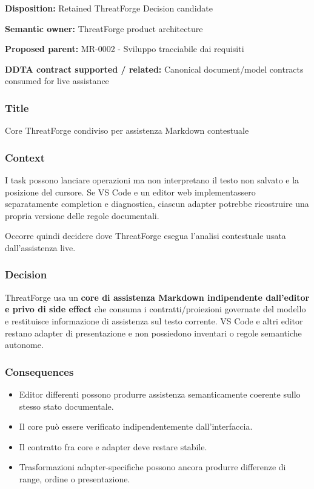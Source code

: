 \documentclass[
  10pt,
  a4paper,
]{article}
\providecommand{\tightlist}{%
  \setlength{\itemsep}{0pt}\setlength{\parskip}{0pt}}
\begin{document}
\textbf{Disposition:} Retained ThreatForge Decision candidate

\textbf{Semantic owner:} ThreatForge product architecture

\textbf{Proposed parent:} MR-0002 - Sviluppo tracciabile dai requisiti

\textbf{DDTA contract supported / related:} Canonical document/model
contracts consumed for live assistance

\subsubsection{Title}\label{title-13}

Core ThreatForge condiviso per assistenza Markdown contestuale

\subsubsection{Context}\label{context-13}

I task possono lanciare operazioni ma non interpretano il testo non
salvato e la posizione del cursore. Se VS Code e un editor web
implementassero separatamente completion e diagnostica, ciascun adapter
potrebbe ricostruire una propria versione delle regole documentali.

Occorre quindi decidere dove ThreatForge esegua l'analisi contestuale
usata dall'assistenza live.

\subsubsection{Decision}\label{decision-13}

ThreatForge usa un \textbf{core di assistenza Markdown indipendente
dall'editor e privo di side effect} che consuma i contratti/proiezioni
governate del modello e restituisce informazione di assistenza sul testo
corrente. VS Code e altri editor restano adapter di presentazione e non
possiedono inventari o regole semantiche autonome.

\subsubsection{Consequences}\label{consequences-13}

\begin{itemize}
\tightlist
\item
  Editor differenti possono produrre assistenza semanticamente coerente
  sullo stesso stato documentale.
\item
  Il core può essere verificato indipendentemente dall'interfaccia.
\item
  Il contratto fra core e adapter deve restare stabile.
\item
  Trasformazioni adapter-specifiche possono ancora produrre differenze
  di range, ordine o presentazione.
\end{itemize}
\end{document}
